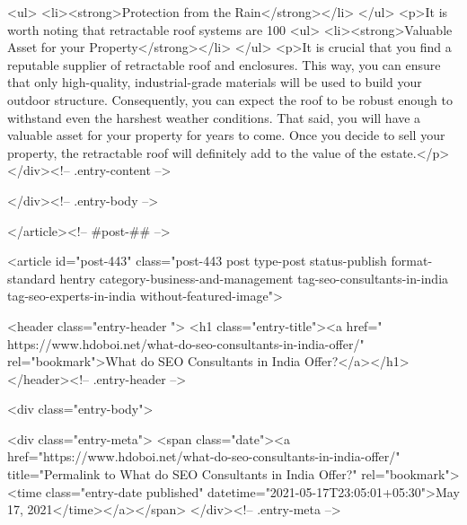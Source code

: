 <ul>
<li><strong>Protection from the Rain</strong></li>
</ul>
<p>It is worth noting that retractable roof systems are 100%
<ul>
<li><strong>Valuable Asset for your Property</strong></li>
</ul>
<p>It is crucial that you find a reputable supplier of retractable roof and enclosures. This way, you can ensure that only high-quality, industrial-grade materials will be used to build your outdoor structure. Consequently, you can expect the roof to be robust enough to withstand even the harshest weather conditions. That said, you will have a valuable asset for your property for years to come. Once you decide to sell your property, the retractable roof will definitely add to the value of the estate.</p>
					</div><!-- .entry-content -->
		
		
			</div><!-- .entry-body -->

</article><!-- #post-## -->

			
				
<article id="post-443" class="post-443 post type-post status-publish format-standard hentry category-business-and-management tag-seo-consultants-in-india tag-seo-experts-in-india without-featured-image">

	
	<header class="entry-header ">
					<h1 class="entry-title"><a href=" https://www.hdoboi.net/what-do-seo-consultants-in-india-offer/" rel="bookmark">What do SEO Consultants in India Offer?</a></h1>			</header><!-- .entry-header -->

	<div class="entry-body">

				<div class="entry-meta">
			<span class="date"><a href="https://www.hdoboi.net/what-do-seo-consultants-in-india-offer/" title="Permalink to What do SEO Consultants in India Offer?" rel="bookmark"><time class="entry-date published" datetime="2021-05-17T23:05:01+05:30">May 17, 2021</time></a></span>		</div><!-- .entry-meta -->
		
